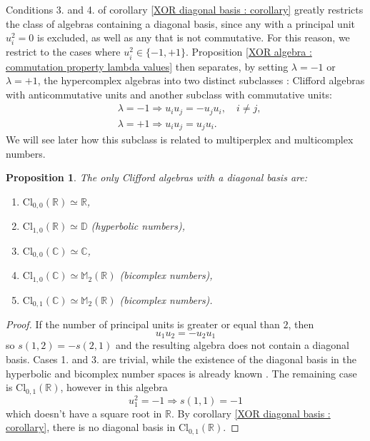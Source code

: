 \documentclass{article}
\newtheorem{proposition}[theorem]{Proposition}
\begin{document}
Conditions 3. and 4. of corollary \ref{XOR diagonal basis : corollary} greatly restricts the class of algebras containing a diagonal basis, since any with a principal unit $u_i^2 = 0$ is excluded, as well as any that is not commutative. For this reason, we restrict to the cases where $u_i^2 \in \{ -1 ,+1 \}$. Proposition \ref{XOR algebra : commutation property lambda values} then separates, by setting $\lambda = -1$ or $\lambda = +1$, the hypercomplex algebras into two distinct subclasses : Clifford algebras with anticommutative units and another subclass with commutative units:
$$ \begin{aligned}
    & \lambda = -1 \Rightarrow u_i u_j = -u_j u_i, \quad i \neq j,\\
    & \lambda = +1 \Rightarrow u_i u_j = u_j u_i.
\end{aligned} $$
We will see later how this subclass is related to multiperplex and multicomplex numbers.
\begin{proposition}
    The only Clifford algebras with a diagonal basis are:
    \begin{enumerate}
        \item $\mathrm{Cl}_{0,0}(\mathbb{R}) \simeq \mathbb{R}$,
        \item $\mathrm{Cl}_{1,0}(\mathbb{R}) \simeq \mathbb{D}$ (hyperbolic numbers),
        \item $\mathrm{Cl}_{0,0}(\mathbb{C}) \simeq \mathbb{C}$,
        \item $\mathrm{Cl}_{1,0}(\mathbb{C}) \simeq \mathbb{M}_2(\mathbb{R})$ (bicomplex numbers),
        \item $\mathrm{Cl}_{0,1}(\mathbb{C}) \simeq \mathbb{M}_2(\mathbb{R})$ (bicomplex numbers).
    \end{enumerate}
\end{proposition}
\begin{proof}
    If the number of principal units is greater or equal than $2$, then
    $$ u_1 u_2 = - u_2 u_1 $$
    so $s(1,2) = -s(2,1)$ and the resulting algebra does not contain a diagonal basis. Cases 1. and 3. are trivial, while the existence of the diagonal basis in the hyperbolic and bicomplex number spaces is already known \cite{GuillaumeBrouillette, courchesneAndTremblay2025}. The remaining case is $\mathrm{Cl}_{0,1}(\mathbb{R})$, however in this algebra
    $$ u_1^2 = - 1 \Rightarrow s(1,1) = -1 $$
    which doesn't have a square root in $\mathbb{R}$. By corollary \ref{XOR diagonal basis : corollary}, there is no diagonal basis in $\mathrm{Cl}_{0,1}(\mathbb{R})$.
\end{proof}
\end{document}
